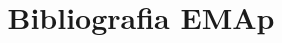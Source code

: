\documentclass{article}
\begin{document}
\title{Bibliografia EMAp}
\maketitle

\nocite{*}


\end{document}
